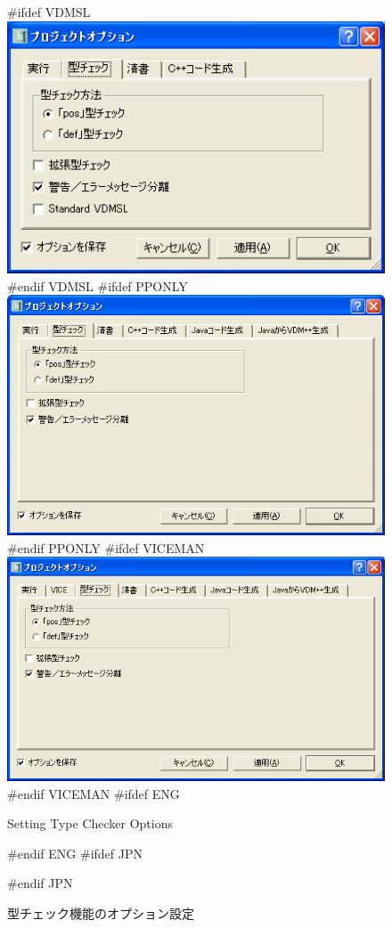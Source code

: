 \documentclass[\pformat,12pt]{article}
\begin{document}
\begin{figure}[tbh]
\begin{center}
#ifdef VDMSL
\includegraphics[width=12cm]{tcOptions-sl.png}
#endif VDMSL
#ifdef PPONLY
\includegraphics[width=12cm]{tcOptions-pp.png}
#endif PPONLY
#ifdef VICEMAN
\includegraphics[width=12cm]{tcOptions-vice.png}
#endif VICEMAN
#ifdef ENG
\caption{Setting Type Checker Options}
#endif ENG
#ifdef JPN
\caption{型チェック機能のオプション設定}
#endif JPN
\label{fig:opttc}
\end{center}
\end{figure}
\end{document}
